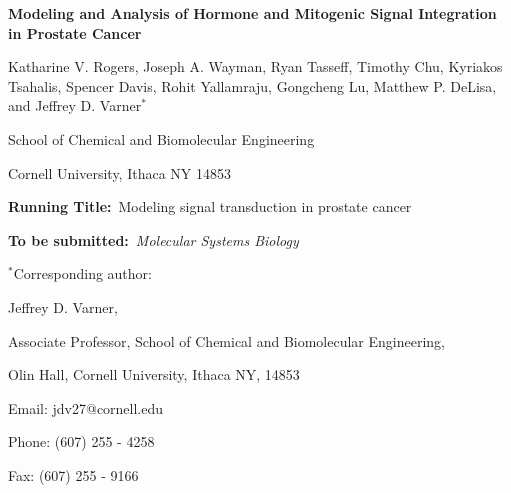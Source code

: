 \documentclass[12pt]{article}
\begin{document}
\begin{titlepage}
{\par\centering\textbf{\Large Modeling and Analysis of Hormone and Mitogenic Signal Integration in Prostate Cancer}}
\vspace{0.05in}
{\par \centering \large{ Katharine V. Rogers, Joseph A. Wayman, Ryan Tasseff, Timothy Chu, Kyriakos Tsahalis, Spencer Davis, Rohit Yallamraju, Gongcheng Lu, Matthew P. DeLisa, 
and Jeffrey D. Varner$^{*}$}}
\vspace{0.10in}
{\par \centering \large{School of Chemical and Biomolecular Engineering}}
{\par \centering \large{Cornell University, Ithaca NY 14853}}
\vspace{0.1in}
{\par \centering \textbf{Running Title:}~Modeling signal transduction in prostate cancer}
\vspace{0.1in}
{\par \centering \textbf{To be submitted:}~\emph{Molecular Systems Biology}}
\vspace{0.5in}
{\par \centering $^{*}$Corresponding author:}
{\par \centering Jeffrey D. Varner,}
{\par \centering Associate Professor, School of Chemical and Biomolecular Engineering,}
{\par {} Olin Hall, Cornell University, Ithaca NY, 14853} 
{\par \centering Email: jdv27@cornell.edu} 
{\par \centering Phone: (607) 255 - 4258}
{\par \centering Fax: (607) 255 - 9166}
\end{titlepage}
\date{}
\thispagestyle{empty}
\pagebreak
\end{document}
